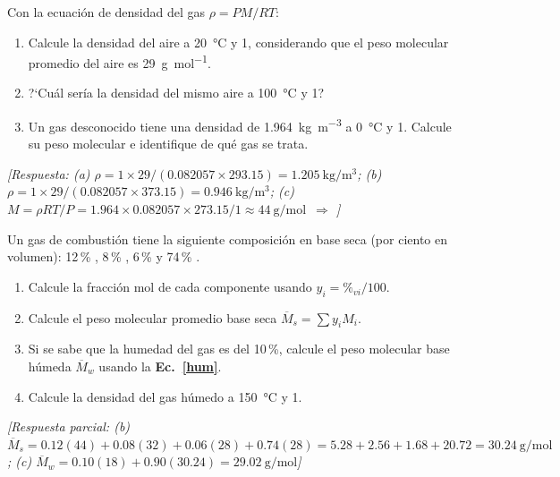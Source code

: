 \begin{bloque_ejercicios}
\begin{ejercicios}
\item Con la ecuaci\'on de densidad del gas $\rho = PM/RT$:

\begin{enumerate}[label=\alph*)]
    \item Calcule la densidad del aire a \SI{20}{\celsius} y
          \SI{1}{\atm}, considerando que el peso molecular promedio
          del aire es \SI{29}{\gram\per\mole}.
    \item ?`Cu\'al ser\'ia la densidad del mismo aire a
          \SI{100}{\celsius} y \SI{1}{\atm}?
    \item Un gas desconocido tiene una densidad de
          \SI{1.964}{\kilo\gram\per\cubic\metre} a \SI{0}{\celsius}
          y \SI{1}{\atm}. Calcule su peso molecular e identifique
          de qu\'e gas se trata.
\end{enumerate}

\textit{[Respuesta:
(a) $\rho = 1\times29/(0.082057\times293.15)
= \SI{1.205}{\kilo\gram\per\cubic\metre}$;
(b) $\rho = 1\times29/(0.082057\times373.15)
= \SI{0.946}{\kilo\gram\per\cubic\metre}$;
(c) $M = \rho RT/P
= 1.964\times0.082057\times273.15/1
\approx \SI{44}{\gram\per\mole}$\ $\Rightarrow$ ]}

\item Un gas de combusti\'on tiene la siguiente composici\'on
en base seca (por ciento en volumen):
12\,\% , 8\,\% , 6\,\%  y 74\,\% .

\begin{enumerate}[label=\alph*)]
    \item Calcule la fracci\'on mol de cada componente
          usando $y_i = \%_{vi}/100$.
    \item Calcule el peso molecular promedio base seca
          $\overline{M}_s = \sum y_i M_i$.
    \item Si se sabe que la humedad del gas es del 10\,\%,
          calcule el peso molecular base h\'umeda
          $\overline{M}_w$ usando la \textbf{Ec.~\ref{hum}}.
    \item Calcule la densidad del gas h\'umedo a \SI{150}{\celsius}
          y \SI{1}{\atm}.
\end{enumerate}

\textit{[Respuesta parcial:
(b) $\overline{M}_s = 0.12(44)+0.08(32)+0.06(28)+0.74(28)
= 5.28+2.56+1.68+20.72 = \SI{30.24}{\gram\per\mole}$;
(c) $\overline{M}_w = 0.10(18)+0.90(30.24)
= \SI{29.02}{\gram\per\mole}$]}


\end{ejercicios}
\end{bloque_ejercicios}
